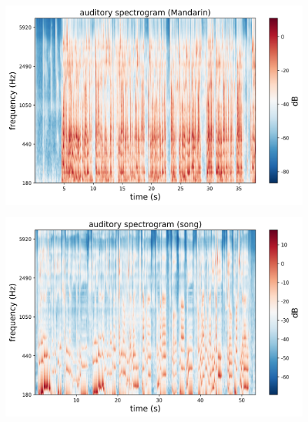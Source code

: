 \documentclass[jou,12pt,floatsintext]{apa7} %
\begin{document}
\begin{figure}[!htb]
    \centering
    \begin{minipage}{0.49\textwidth}
        \centering
        \subcaption{}
        \vspace{-0.5em}
        \includegraphics[width=\textwidth]{figure/shuohua.png}
        \label{spectrogram:shuohua}
    \end{minipage}
    \begin{minipage}{0.49\textwidth}
        \centering
        \subcaption{}
        \vspace{-0.5em}
        \includegraphics[width=\textwidth]{figure/song.png}
        \label{spectrogram:song}
    \end{minipage}
    
    \vspace{-2em} %
    

\end{figure}
\end{document}
